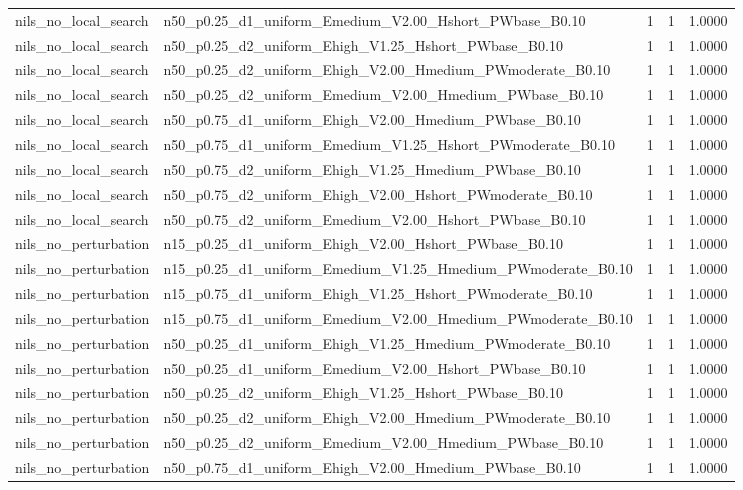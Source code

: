 \begin{tabular}{llrrr}
nils_no_local_search & n50_p0.25_d1_uniform_Emedium_V2.00_Hshort_PWbase_B0.10 & 1 & 1 & 1.0000 \\
nils_no_local_search & n50_p0.25_d2_uniform_Ehigh_V1.25_Hshort_PWbase_B0.10 & 1 & 1 & 1.0000 \\
nils_no_local_search & n50_p0.25_d2_uniform_Ehigh_V2.00_Hmedium_PWmoderate_B0.10 & 1 & 1 & 1.0000 \\
nils_no_local_search & n50_p0.25_d2_uniform_Emedium_V2.00_Hmedium_PWbase_B0.10 & 1 & 1 & 1.0000 \\
nils_no_local_search & n50_p0.75_d1_uniform_Ehigh_V2.00_Hmedium_PWbase_B0.10 & 1 & 1 & 1.0000 \\
nils_no_local_search & n50_p0.75_d1_uniform_Emedium_V1.25_Hshort_PWmoderate_B0.10 & 1 & 1 & 1.0000 \\
nils_no_local_search & n50_p0.75_d2_uniform_Ehigh_V1.25_Hmedium_PWbase_B0.10 & 1 & 1 & 1.0000 \\
nils_no_local_search & n50_p0.75_d2_uniform_Ehigh_V2.00_Hshort_PWmoderate_B0.10 & 1 & 1 & 1.0000 \\
nils_no_local_search & n50_p0.75_d2_uniform_Emedium_V2.00_Hshort_PWbase_B0.10 & 1 & 1 & 1.0000 \\
nils_no_perturbation & n15_p0.25_d1_uniform_Ehigh_V2.00_Hshort_PWbase_B0.10 & 1 & 1 & 1.0000 \\
nils_no_perturbation & n15_p0.25_d1_uniform_Emedium_V1.25_Hmedium_PWmoderate_B0.10 & 1 & 1 & 1.0000 \\
nils_no_perturbation & n15_p0.75_d1_uniform_Ehigh_V1.25_Hshort_PWmoderate_B0.10 & 1 & 1 & 1.0000 \\
nils_no_perturbation & n15_p0.75_d1_uniform_Emedium_V2.00_Hmedium_PWmoderate_B0.10 & 1 & 1 & 1.0000 \\
nils_no_perturbation & n50_p0.25_d1_uniform_Ehigh_V1.25_Hmedium_PWmoderate_B0.10 & 1 & 1 & 1.0000 \\
nils_no_perturbation & n50_p0.25_d1_uniform_Emedium_V2.00_Hshort_PWbase_B0.10 & 1 & 1 & 1.0000 \\
nils_no_perturbation & n50_p0.25_d2_uniform_Ehigh_V1.25_Hshort_PWbase_B0.10 & 1 & 1 & 1.0000 \\
nils_no_perturbation & n50_p0.25_d2_uniform_Ehigh_V2.00_Hmedium_PWmoderate_B0.10 & 1 & 1 & 1.0000 \\
nils_no_perturbation & n50_p0.25_d2_uniform_Emedium_V2.00_Hmedium_PWbase_B0.10 & 1 & 1 & 1.0000 \\
nils_no_perturbation & n50_p0.75_d1_uniform_Ehigh_V2.00_Hmedium_PWbase_B0.10 & 1 & 1 & 1.0000 \\

\end{tabular}
